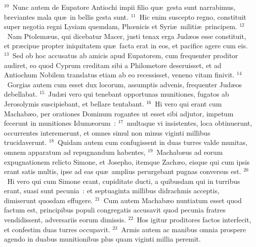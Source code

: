${}^{10}$~Nunc autem de Eupatore Antiochi impii filio qu\ae\ gesta sunt narrabimus, breviantes mala qu\ae\ in bellis gesta sunt.
${}^{11}$~Hic enim suscepto regno, constituit super negotia regni Lysiam quemdam, Phœnicis et Syri\ae\ militi\ae\ principem.
${}^{12}$~Nam Ptolem\ae us, qui dicebatur Macer, justi tenax erga Jud\ae os esse constituit, et pr\ae cipue propter iniquitatem qu\ae\ facta erat in eos, et pacifice agere cum eis.
${}^{13}$~Sed ob hoc accusatus ab amicis apud Eupatorem, cum frequenter proditor audiret, eo quod Cyprum creditam sibi a Philometore deseruisset, et ad Antiochum Nobilem translatus etiam ab eo recessisset, veneno vitam finivit.
${}^{14}$~Gorgias autem cum esset dux locorum, assumptis advenis, frequenter Jud\ae os debellabat.
${}^{15}$~Jud\ae i vero qui tenebant opportunas munitiones, fugatos ab Jerosolymis suscipiebant, et bellare tentabant.
${}^{16}$~Hi vero qui erant cum Machab\ae o, per orationes Dominum rogantes ut esset sibi adjutor, impetum fecerunt in munitiones Idum\ae orum~:
${}^{17}$~multaque vi insistentes, loca obtinuerunt, occurrentes interemerunt, et omnes simul non minus viginti millibus trucidaverunt.
${}^{18}$~Quidam autem cum confugissent in duas turres valde munitas, omnem apparatum ad repugnandum habentes,
${}^{19}$~Machab\ae us ad eorum expugnationem relicto Simone, et Josepho, itemque Zach\ae o, eisque qui cum ipsis erant satis multis, ipse ad eas qu\ae\ amplius perurgebant pugnas conversus est.
${}^{20}$~Hi vero qui cum Simone erant, cupiditate ducti, a quibusdam qui in turribus erant, suasi sunt pecunia~: et septuaginta millibus didrachmis acceptis, dimiserunt quosdam effugere.
${}^{21}$~Cum autem Machab\ae o nuntiatum esset quod factum est, principibus populi congregatis accusavit quod pecunia fratres vendidissent, adversariis eorum dimissis.
${}^{22}$~Hos igitur proditores factos interfecit, et confestim duas turres occupavit.
${}^{23}$~Armis autem ac manibus omnia prospere agendo in duabus munitionibus plus quam viginti millia peremit.


